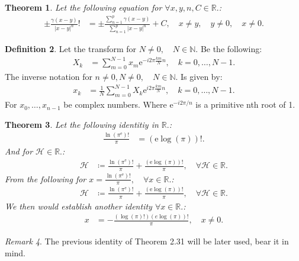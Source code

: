 \documentclass[10pt]{article}
\theoremstyle{plain}
\newtheorem{theorem}{Theorem}[section]
\theoremstyle{definition}
\newtheorem{definition}[theorem]{Definition}
\theoremstyle{remark}
\newtheorem{remark}[theorem]{Remark}
\begin{document}
\begin{theorem}
	Let the following equation for $\forall x, y, n, C \in \mathbb{R}.$:
	\begin{align*}
		\pm \frac{\gamma(x-y)}{|x - y|^{n}}! &= \pm \frac{\sum_{n=1}^{p}\gamma(x-y)}{\sum_{n=1}^{p}|x - y|^{n}} + C, \quad x \neq y, \quad y \neq 0, \quad x \neq 0.
	\end{align*}
\end{theorem}

\begin{definition}
	Let the transform for $N \neq 0, \quad N \in \mathbb{N}.$ Be the following:
	\begin{align*}
		X_k &= \sum_{m=0}^{N-1} x_{m}\mathrm{e}^{-i2\pi \frac{km}{N}n}, \quad k = 0,\dots,N-1.
	\end{align*}
	The inverse notation for $n \neq 0, N \neq 0, \quad N \in \mathbb{N}.$ Is given by:
	\begin{align*}
		x_k &= \frac{1}{N} \sum_{m=0}^{N-1} X_k \mathrm{e}^{i2\pi \frac{km}{N}n}, \quad k = 0,\dots,N-1.
	\end{align*}
	For $x_{0}, \dots, x_{n-1}$ be complex numbers. Where $\mathrm{e}^{-i2\pi /n}$ is a primitive nth root of 1.
\end{definition}

\begin{theorem}
	Let the following identitiy in $\mathbb{R}.$:
	\begin{align*}
		\frac{\ln(\pi^\mathrm{e})!}{\pi} &= (\mathrm{e} \log(\pi))!.
	\end{align*}
	And for $\mathcal{H} \in \mathbb{R}.$:
	\begin{align*}
		\mathcal{H} &\coloneq \frac{\ln(\pi^\mathrm{e})!}{\pi} + \frac{(\mathrm{e} \log(\pi))!}{\pi}, \quad \forall \mathcal{H} \in \mathbb{R}.
	\end{align*}
	From the following for $x = \frac{\ln(\pi^\mathrm{e})!}{\pi}, \quad \forall x \in \mathbb{R}.$:
	\begin{align*}
	\mathcal{H} &\coloneq \frac{\ln(\pi^\mathrm{e})!}{\pi} + \frac{(\mathrm{e} \log(\pi))!}{\pi}, \quad \forall \mathcal{H} \in \mathbb{R}.
	\end{align*}
	We then would establish another identity $\forall x \in \mathbb{R}.$:
	\begin{align*}
		x &= -\frac{(\log(\pi)!) (e \log(\pi))!}{\pi}, \quad x \neq 0.
	\end{align*}
\end{theorem}
\begin{remark}
	The previous identity of Theorem 2.31 will be later used, bear it in mind.
\end{remark}
\end{document}
